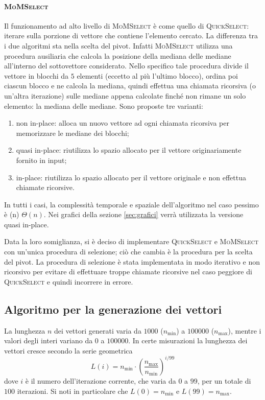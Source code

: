 \documentclass[a4paper,12pt]{article}
\newcommand{\QuickSelect}{\textsc{QuickSelect}}
\newcommand{\MoMSelect}{\textsc{MoMSelect}}
\newcommand{\Tlin}{\ifmmode \Theta(n) \else $\Theta(n)$\fi} %
\begin{document}
\paragraph{\MoMSelect}
Il funzionamento ad alto livello di \MoMSelect{} è come quello di \QuickSelect: iterare sulla porzione di vettore che contiene l'elemento cercato.
La differenza tra i due algoritmi sta nella scelta del pivot.
Infatti \MoMSelect{} utilizza una procedura ausiliaria che calcola la posizione della mediana delle mediane all'interno del sottovettore considerato.
Nello specifico tale procedura divide il vettore in blocchi da $5$ elementi (eccetto al più l'ultimo blocco), ordina poi ciascun blocco e ne calcola la mediana, quindi effettua una chiamata ricorsiva (o un'altra iterazione) sulle mediane appena calcolate finché non rimane un solo elemento: la mediana delle mediane.
Sono proposte tre varianti:
\begin{enumerate}
    \item non in-place: alloca un nuovo vettore ad ogni chiamata ricorsiva per memorizzare le mediane dei blocchi;
    \item quasi in-place: riutilizza lo spazio allocato per il vettore originariamente fornito in input;
    \item in-place: riutilizza lo spazio allocato per il vettore originale e non effettua chiamate ricorsive.
\end{enumerate}
In tutti i casi, la complessità temporale e spaziale dell'algoritmo nel caso pessimo è \Tlin{}.
Nei grafici della sezione \ref{sec:grafici} verrà utilizzata la versione quasi in-place.

Data la loro somiglianza, si è deciso di implementare \QuickSelect{} e \MoMSelect{} con un'unica procedura di selezione; ciò che cambia è la procedura per la scelta del pivot.
La procedura di selezione è stata implementata in modo iterativo e non ricorsivo per evitare di effettuare troppe chiamate ricorsive nel caso peggiore di \QuickSelect{} e quindi incorrere in errore.

\subsection{Algoritmo per la generazione dei vettori}
La lunghezza $n$ dei vettori generati varia da $1000$ ($n_{\min}$) a $100000$ ($n_{\max}$), mentre i valori degli interi variano da $0$ a $100000$.
In certe misurazioni la lunghezza dei vettori cresce secondo la serie geometrica
\[
    L(i) = n_{\min} \cdot \left(\frac{n_{\max}}{n_{\min}}\right)^{i/99}
\]
dove $i$ è il numero dell'iterazione corrente, che varia da $0$ a $99$, per un totale di $100$ iterazioni.
Si noti in particolare che $L(0) = n_{\min}$ e $L(99) = n_{\max}$.
\end{document}
